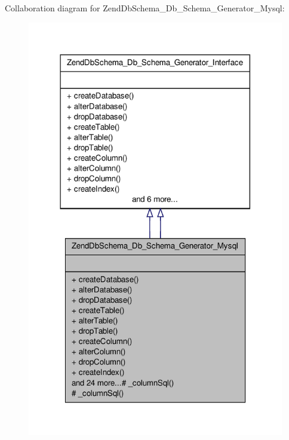 \-Collaboration diagram for \-Zend\-Db\-Schema\-\_\-\-Db\-\_\-\-Schema\-\_\-\-Generator\-\_\-\-Mysql\-:\nopagebreak
\begin{figure}[H]
\begin{center}
\leavevmode
\includegraphics[width=318pt]{classZendDbSchema__Db__Schema__Generator__Mysql__coll__graph}
\end{center}
\end{figure}
